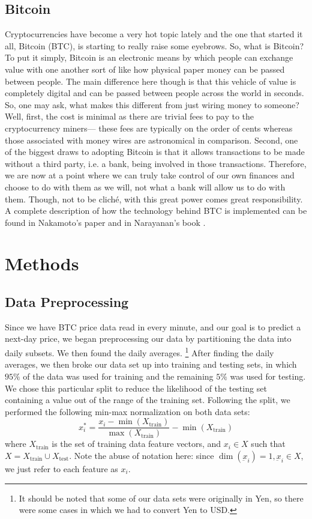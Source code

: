 \documentclass[conference]{IEEEtran}
\begin{document}
\subsection{Bitcoin}
Cryptocurrencies have become a very hot topic lately and the one that started it all, Bitcoin
(BTC), is starting to really raise some eyebrows. So, what is Bitcoin? To put it simply, Bitcoin
is an electronic means by which people can exchange value with one another sort of like how
physical paper money can be passed between people. The main difference here though is that this
vehicle of value is completely digital and can be passed between people across the world in
seconds. So, one may ask, what makes this different from just wiring money to someone? Well,
first, the cost is minimal as there are trivial fees to pay to the cryptocurrency miners---
these fees are typically on the order of cents whereas those associated with money wires are
astronomical in comparison. Second, one of the biggest draws to adopting Bitcoin is that it
allows transactions to be made without a third party, i.e. a bank, being  involved in those
transactions. Therefore, we are now at a point where we can truly take control of our own
finances and choose to do with them as we will, not what a bank will allow us to do with
them. Though, not to be clich\'e, with this great power comes great responsibility. A
complete description of how the technology behind BTC is implemented can be found in
Nakamoto's paper \cite{b1} and in Narayanan's book \cite{b17}.

\section{Methods}
\subsection{Data Preprocessing}
Since we have BTC price data read in every minute, and our goal is to predict a next-day price,
we began preprocessing our data by partitioning the data into daily subsets. We then found the
daily averages.
\footnote{It should be noted that some of our data sets were originally in Yen, so there were
some cases in which we had to convert Yen to USD.}
After finding the daily averages, we then broke our data set up into training and testing sets, 
in which $95\%$ of the data was used for training and the remaining $5\%$ was used for testing.
We chose this particular split to reduce the likelihood of the testing set containing a value out
of the range of the training set. Following the split, we performed the following min-max
normalization on both data sets:
\begin{equation*}
x_{i}^{*} = \frac{x_i - \min(X_{\text{train}})}{\max(X_{\text{train}})} - \min(X_{\text{train}})
\end{equation*}
where $X_{\text{train}}$ is the set of training data feature vectors, and $x_i \in  X$ such that
$X = X_{\text{train}}\cup X_{\text{test}}$. Note the abuse of notation here: since
$\dim(\underbar{x}_i) = 1, \underbar{x}_i \in X$, we just refer to each feature as $x_i$.
\end{document}
